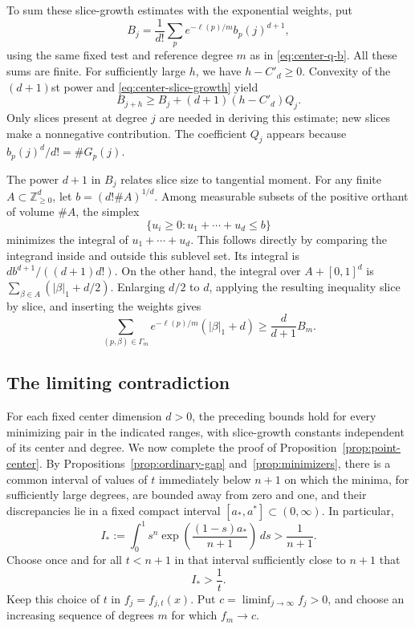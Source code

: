 To sum these slice-growth estimates with the exponential weights, put
\[
 B_j=\frac1{d!}\sum_p e^{-\ell(p)/m}b_p(j)^{d+1},
\]
using the same fixed test and reference degree $m$ as in
\eqref{eq:center-q-b}.
All these sums are finite. For sufficiently large $h$, we have
$h-C'_d\ge0$. Convexity of the $(d+1)$st power and
\eqref{eq:center-slice-growth} yield
\begin{equation}\label{eq:center-b-growth}
 B_{j+h}\ge B_j+(d+1)(h-C'_d)Q_j.
\end{equation}
Only slices present at degree $j$ are needed in deriving this estimate;
new slices make a nonnegative contribution. The coefficient $Q_j$
appears because $b_p(j)^d/d!=\#G_p(j)$.

The power $d+1$ in $B_j$ relates slice size to tangential moment. For any
finite $A\subset\mathbb Z_{\ge0}^d$, let $b=(d!\#A)^{1/d}$. Among
measurable subsets of the positive orthant of volume $\#A$, the simplex
\[
 \{u_i\ge0: u_1+\cdots+u_d\le b\}
\]
minimizes the integral of $u_1+\cdots+u_d$. This follows directly by
comparing the integrand inside and outside this sublevel set. Its
integral is $d b^{d+1}/((d+1)d!)$. On the other hand, the integral over
$A+[0,1]^d$ is $\sum_{\beta\in A}(|\beta|_1+d/2)$. Enlarging $d/2$ to
$d$, applying the resulting inequality slice by slice, and inserting
the weights gives
\begin{equation}\label{eq:center-moment}
 \sum_{(p,\beta)\in\Gamma_m}
 e^{-\ell(p)/m}(|\beta|_1+d)
 \ge \frac{d}{d+1}B_m.
\end{equation}

\subsection{The limiting contradiction}

For each fixed center dimension $d>0$, the preceding bounds hold for
every minimizing pair in the indicated ranges, with slice-growth
constants independent of its center and degree.
We now complete the proof of Proposition~\ref{prop:point-center}. By
Propositions~\ref{prop:ordinary-gap} and~\ref{prop:minimizers}, there is
a common interval of values of $t$ immediately below $n+1$ on which
the minima, for sufficiently large degrees, are bounded away from zero
and one, and their discrepancies lie in a fixed compact interval
$[a_*,a^*]\subset(0,\infty)$. In particular,
\[
 I_*:=\int_0^1 s^n
       \exp\!\left(\frac{(1-s)a_*}{n+1}\right)\,ds
       >\frac1{n+1}.
\]
Choose once and for all $t<n+1$ in that interval sufficiently close to
$n+1$ that
\begin{equation}\label{eq:center-choose-t}
 I_*>\frac1t.
\end{equation}
Keep this choice of $t$ in $f_j=f_{j,t}(x)$. Put
$c=\liminf_{j\to\infty}f_j>0$, and choose
an increasing sequence of degrees $m$ for which $f_m\to c$.

